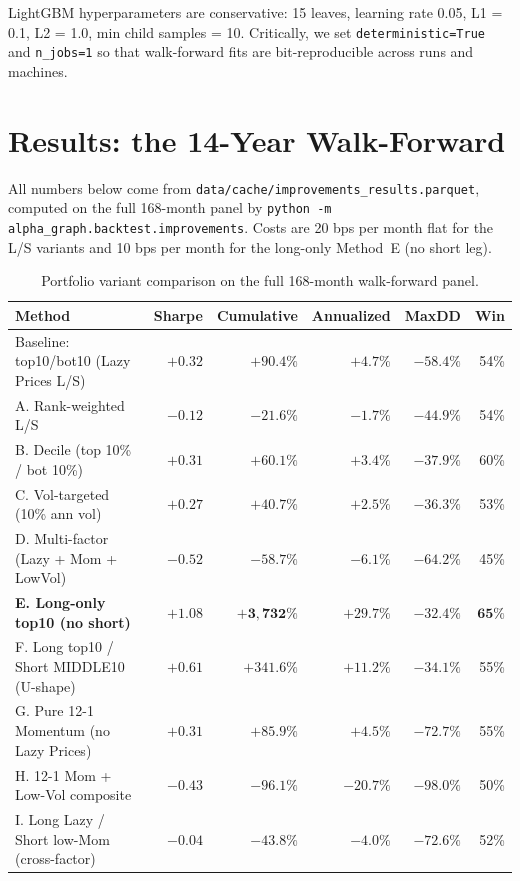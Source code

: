 \documentclass[11pt,a4paper]{article}
\begin{document}
LightGBM hyperparameters are conservative: 15 leaves, learning rate 0.05, L1 = 0.1, L2 = 1.0, min child samples = 10. Critically, we set \texttt{deterministic=True} and \texttt{n\_jobs=1} so that walk-forward fits are bit-reproducible across runs and machines.

\section{Results: the 14-Year Walk-Forward}
\label{sec:results}

All numbers below come from \texttt{data/cache/improvements\_results.parquet}, computed on the full 168-month panel by \texttt{python -m alpha\_graph.backtest.improvements}. Costs are 20 bps per month flat for the L/S variants and 10 bps per month for the long-only Method~E (no short leg).

\begin{table}[H]
\centering
\caption{Portfolio variant comparison on the full 168-month walk-forward panel.}
\label{tab:improvements}
\begin{tabular}{lrrrrr}
\toprule
Method & Sharpe & Cumulative & Annualized & MaxDD & Win \\
\midrule
Baseline: top10/bot10 (Lazy Prices L/S) & $+0.32$ & $+90.4\%$ & $+4.7\%$ & $-58.4\%$ & 54\% \\
A. Rank-weighted L/S & $-0.12$ & $-21.6\%$ & $-1.7\%$ & $-44.9\%$ & 54\% \\
B. Decile (top 10\% / bot 10\%) & $+0.31$ & $+60.1\%$ & $+3.4\%$ & $-37.9\%$ & 60\% \\
C. Vol-targeted (10\% ann vol) & $+0.27$ & $+40.7\%$ & $+2.5\%$ & $-36.3\%$ & 53\% \\
D. Multi-factor (Lazy + Mom + LowVol) & $-0.52$ & $-58.7\%$ & $-6.1\%$ & $-64.2\%$ & 45\% \\
\textbf{E. Long-only top10 (no short)} & $\mathbf{+1.08}$ & $\mathbf{+3{,}732\%}$ & $\mathbf{+29.7\%}$ & $\mathbf{-32.4\%}$ & $\mathbf{65\%}$ \\
F. Long top10 / Short MIDDLE10 (U-shape) & $+0.61$ & $+341.6\%$ & $+11.2\%$ & $-34.1\%$ & 55\% \\
G. Pure 12-1 Momentum (no Lazy Prices) & $+0.31$ & $+85.9\%$ & $+4.5\%$ & $-72.7\%$ & 55\% \\
H. 12-1 Mom + Low-Vol composite & $-0.43$ & $-96.1\%$ & $-20.7\%$ & $-98.0\%$ & 50\% \\
I. Long Lazy / Short low-Mom (cross-factor) & $-0.04$ & $-43.8\%$ & $-4.0\%$ & $-72.6\%$ & 52\% \\
\bottomrule
\end{tabular}
\end{table}
\end{document}
